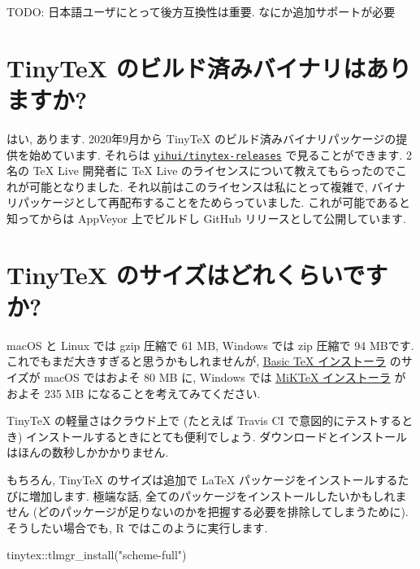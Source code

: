 \documentclass[
  xelatex,ja=standard,jafont=noto]{bxjsreport}
\newenvironment{Shaded}{\begin{snugshade}}{\end{snugshade}}
\newcommand{\FunctionTok}[1]{\textcolor[rgb]{0.00,0.00,0.00}{#1}}
\newcommand{\NormalTok}[1]{#1}
\newcommand{\SpecialCharTok}[1]{\textcolor[rgb]{0.00,0.00,0.00}{#1}}
\newcommand{\StringTok}[1]{\textcolor[rgb]{0.31,0.60,0.02}{#1}}
\begin{document}
TODO: 日本語ユーザにとって後方互換性は重要. なにか追加サポートが必要

\hypertarget{tinytex-ux306eux30d3ux30ebux30c9ux6e08ux307fux30d0ux30a4ux30caux30eaux306fux3042ux308aux307eux3059ux304b}{%
\section{TinyTeX
のビルド済みバイナリはありますか?}\label{tinytex-ux306eux30d3ux30ebux30c9ux6e08ux307fux30d0ux30a4ux30caux30eaux306fux3042ux308aux307eux3059ux304b}}

はい, あります. 2020年9月から TinyTeX
のビルド済みバイナリパッケージの提供を始めています. それらは
\href{https://github.com/yihui/tinytex-releases}{\texttt{yihui/tinytex-releases}}
で見ることができます. 2名の TeX Live 開発者に TeX Live
のライセンスについて教えてもらったのでこれが可能となりました.
それ以前はこのライセンスは私にとって複雑で,
バイナリパッケージとして再配布することをためらっていました.
これが可能であると知ってからは AppVeyor 上でビルドし GitHub
リリースとして公開しています.

\hypertarget{faq-tinytex-size}{%
\section{TinyTeX のサイズはどれくらいですか?}\label{faq-tinytex-size}}

macOS と Linux では gzip 圧縮で 61 MB, Windows では zip 圧縮で 94
MBです. これでもまだ大きすぎると思うかもしれませんが,
\href{https://www.tug.org/mactex/morepackages.html}{Basic TeX
インストーラ} のサイズが macOS ではおよそ 80 MB に, Windows では
\href{https://miktex.org/download}{MiKTeX インストーラ} がおよそ 235 MB
になることを考えてみてください.

TinyTeX の軽量さはクラウド上で (たとえば Travis CI
で意図的にテストするとき) インストールするときにとても便利でしょう.
ダウンロードとインストールはほんの数秒しかかかりません.

もちろん, TinyTeX のサイズは追加で LaTeX
パッケージをインストールするたびに増加します. 極端な話,
全てのパッケージをインストールしたいかもしれません
(どのパッケージが足りないのかを把握する必要を排除してしまうために).
そうしたい場合でも, R ではこのように実行します.

\begin{Shaded}
\begin{Highlighting}[numbers=left,,]
\NormalTok{tinytex}\SpecialCharTok{::}\FunctionTok{tlmgr\_install}\NormalTok{(}\StringTok{"scheme{-}full"}\NormalTok{)}
\end{Highlighting}
\end{Shaded}
\end{document}
